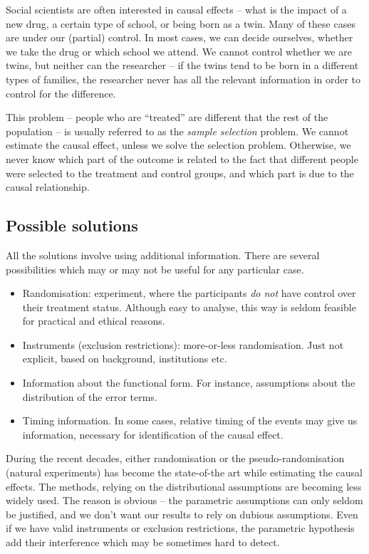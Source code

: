 
Social scientists are often interested in causal effects -- what is
the impact of a new drug, a certain type of school, or being born as
a twin.  Many of these cases are under our (partial) control.  In most
cases, we can decide ourselves, whether we take the drug or which
school we attend.  We cannot control whether we are twins, but neither
can the researcher -- if the twins tend to be born in a different
types of families, the researcher never has all the relevant
information in order to control for the difference.

This problem -- people who are ``treated'' are different that the rest
of the population -- is usually referred to as the \emph{sample
  selection} problem.  We cannot estimate the causal effect, unless we
solve the selection problem.  Otherwise, we never know which part of
the outcome is related to the fact that different people were selected
to the treatment and control groups, and which part is due to the
causal relationship.


\subsection{Possible solutions}

All the solutions involve using additional information.  There are
several possibilities which may or may not be useful for any particular
case. 

\begin{itemize}
\item Randomisation: experiment, where the participants \emph{do not}
  have control over their treatment status.  Although easy to analyse,
  this way is seldom feasible for practical and ethical reasons.
\item Instruments (exclusion restrictions): more-or-less
  randomisation.  Just not explicit, based on background, institutions
  etc.
\item Information about the functional form.  For instance,
  assumptions about the distribution of the error terms.
\item Timing information.  In some cases, relative timing of the
  events may give us information, necessary for identification of the
  causal effect.
\end{itemize}

During the recent decades, either randomisation or the
pseudo-randomisation (natural experiments) has become the state-of-the
art while estimating the causal effects.  The methods, relying on the
distributional assumptions are becoming less widely used.  The reason
is obvious -- the parametric assumptions can only seldom be justified,
and we don't want our results to rely on dubious assumptions.  Even if
we have valid instruments or exclusion restrictions, the parametric
hypothesis add their interference which may be sometimes hard to
detect.  

